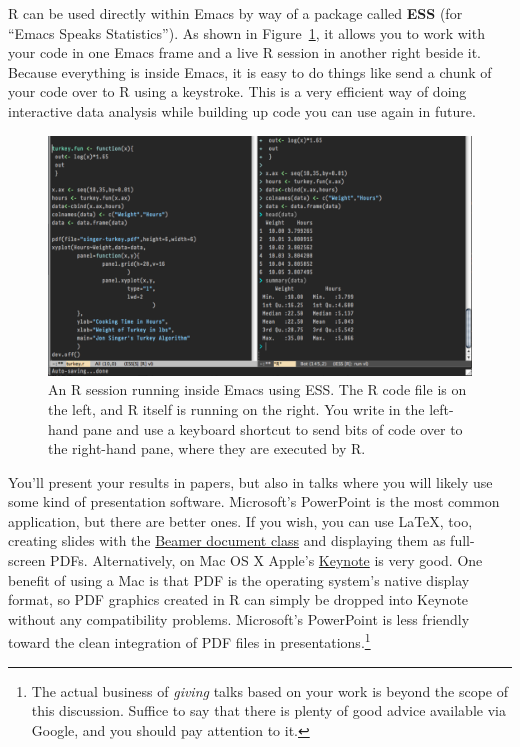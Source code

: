 \documentclass[11pt,article,oneside]{memoir}
\begin{document}
R can be used directly within Emacs by way of a package called \textbf{ESS}
(for ``Emacs Speaks Statistics''). As shown in Figure~\ref{fig:ess}, it allows you to work with your code in one Emacs frame and a live R session in another right beside it. Because everything is inside Emacs, it is easy to do things like send a chunk of your code over to R using a keystroke. This is a very efficient way of doing interactive data analysis while building up code you can use again in future.  

\begin{figure}[h]
	\centering
		\includegraphics[scale=0.35]{figures/ess-r-emacs}
	\caption{An R session running inside Emacs using ESS. The R code file is on the left, and R itself is running on the right. You write in the left-hand pane and use a keyboard shortcut to send bits of code over to the right-hand pane, where they are executed by R.}
	\label{fig:ess}
\end{figure} 

You'll present your results in papers, but also in talks where you will likely use some kind of presentation software. Microsoft's PowerPoint is the most common application, but there are better ones. If you wish, you can use LaTeX, too, creating slides with the \href{http://latex-beamer.sourceforge.net/}{Beamer document class} and displaying them as full-screen PDFs. Alternatively, on Mac OS X Apple's \href{http://www.apple.com/iwork/keynote/}{Keynote} is very good. One benefit of using a Mac is that PDF is the operating system's native display format, so PDF graphics created in R can simply be dropped into Keynote without any compatibility problems. Microsoft's PowerPoint is less friendly toward the clean integration of PDF files in presentations.\footnote{The actual business of \emph{giving} talks based on your work is beyond the scope of this discussion. Suffice to say that there is plenty of good advice available via Google, and you should pay attention to it.} 
                          
\end{document}
